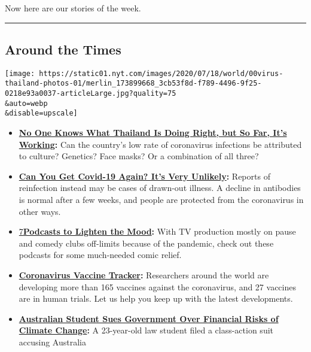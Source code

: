 Now here are our stories of the week.

\begin{center}\rule{0.5\linewidth}{\linethickness}\end{center}

\hypertarget{around-the-times}{%
\subsection{Around the Times}\label{around-the-times}}

\texttt{[image: https://static01.nyt.com/images/2020/07/18/world/00virus-thailand-photos-01/merlin\_173899668\_3cb53f8d-f789-4496-9f25-0218e93a0037-articleLarge.jpg?quality=75\\\&auto=webp\\\&disable=upscale]}

\begin{itemize}
\item
  \textbf{\href{https://www.nytimes.com/2020/07/16/world/asia/coronavirus-thailand-photos.html}{No
  One Knows What Thailand Is Doing Right, but So Far, It's Working}:}
  Can the country's low rate of coronavirus infections be attributed to
  culture? Genetics? Face masks? Or a combination of all three?
\item
  \textbf{\href{https://www.nytimes.com/2020/07/22/health/covid-antibodies-herd-immunity.html}{Can
  You Get Covid-19 Again? It's Very Unlikely}:} Reports of reinfection
  instead may be cases of drawn-out illness. A decline in antibodies is
  normal after a few weeks, and people are protected from the
  coronavirus in other ways.
\item
  \href{https://www.nytimes.com/2020/07/22/arts/comedy-funny-podcasts.html}{7}\textbf{\href{https://www.nytimes.com/2020/07/22/arts/comedy-funny-podcasts.html}{Podcasts
  to Lighten the Mood}:} With TV production mostly on pause and comedy
  clubs off-limits because of the pandemic, check out these podcasts for
  some much-needed comic relief.
\item
  \textbf{\href{https://www.nytimes.com/interactive/2020/science/coronavirus-vaccine-tracker.html}{Coronavirus
  Vaccine Tracker}:} Researchers around the world are developing more
  than 165 vaccines against the coronavirus, and 27 vaccines are in
  human trials. Let us help you keep up with the latest developments.
\item
  \textbf{\href{https://www.nytimes.com/2020/07/23/world/australia/lawsuit-climate-change-bonds.html}{Australian
  Student Sues Government Over Financial Risks of Climate Change}:} A
  23-year-old law student filed a class-action suit accusing Australia

\end{itemize}
